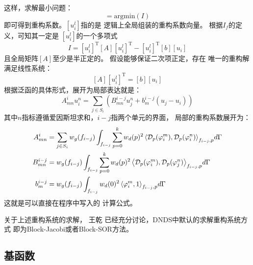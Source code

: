 \documentclass[UTF8,zihao=5]{ctexart} %
\newcommand{\trans}[0]{^\mathrm{T}}
\newcommand*{\mean}[1]{{#1}}
\begin{document}
这样，求解最小问题：
\begin{equation}
    [u_i^l] = \text{argmin}(I)
\end{equation}
即可得到重构系数。$[u_i^l]$指的是
逻辑上全局组装的重构系数向量。
根据$I_f$的定义，可知其一定是
$[u_i^l]$的一个多项式
\begin{equation}
    I = [u_i^l]\trans [A] [u_i^l]\trans
    - [u_i^l]\trans [b][\mean{u}_i]
\end{equation}
且全局矩阵$[A]$至少是半正定的。
假设能够保证二次项正定，存在
唯一的重构解满足线性系统：
\begin{equation} \label{eq:VREQ}
    [A] [u_i^l]\trans
    =[b][\mean{u}_i]
\end{equation}
根据泛函的具体形式，展开为局部表达就是：
\begin{equation} \label{eq:VREQ_local}
    A_{mn}^i u_i^n = \sum_{j\in S_i}{
        \left(B_{mn}^{i-j} u_j^n
        +
        b_{m}^{i-j}(\mean{u}_j - \mean{u}_i)
        \right)}
\end{equation}
其中$n$指标遵循爱因斯坦求和，$i-j$指两个单元的界面，
局部的重构系数展开为：
\begin{equation}
    \begin{aligned} \label{eq:VRCoefs}
        A_{mn}^i     & = \sum_{j\in S_i} {
        w_g(f_{i-j}) \int_{f_{i-j}}{\sum_{p=0}^k{
        w_d(p)^2 \left\langle\mathcal{D}_p(\varphi^m_i),\mathcal{D}_p(\varphi^n_i)\right\rangle_{f_{i-j},p}
        } d\Gamma}}                        \\
        B_{mn}^{i-j} & = {
        w_g(f_{i-j}) \int_{f_{i-j}}{\sum_{p=0}^k{
        w_d(p)^2 \left\langle\mathcal{D}_p(\varphi^m_i),\mathcal{D}_p(\varphi^n_j)\right\rangle_{f_{i-j},p}
        } d\Gamma}}                        \\
        b_{m}^{i-j}  & = {
        w_g(f_{i-j}) \int_{f_{i-j}}{{
        w_d(0)^2 \left\langle\varphi^m_i,1\right\rangle_{f_{i-j},p}
        } d\Gamma}}
    \end{aligned}
\end{equation}
这就是可以直接在程序中写入的
计算公式。

关于上述重构系统的求解，
王乾
\cite{wang2016compact,wang2016compact2,wang2017compact3}
已经充分讨论，DNDS中默认的求解重构系统方式
即为Block-Jacobi或者Block-SOR方法。

\subsection{基函数}
\end{document}
